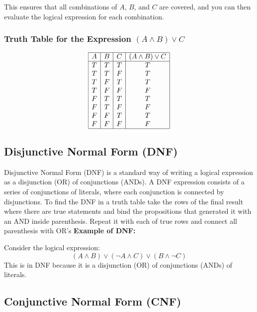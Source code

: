 This ensures that all combinations of \(A\), \(B\), and \(C\) are covered, and you can then evaluate the logical expression for each combination.

\subsubsection*{Truth Table for the Expression \( (A \land B) \lor C \)}

\[
	\begin{array}{|c|c|c|c|}
		\hline
		A & B & C & (A \land B) \lor C \\
		\hline
		T & T & T & T                  \\
		T & T & F & T                  \\
		T & F & T & T                  \\
		T & F & F & F                  \\
		F & T & T & T                  \\
		F & T & F & F                  \\
		F & F & T & T                  \\
		F & F & F & F                  \\
		\hline
	\end{array}
\]

\subsection{Disjunctive Normal Form (DNF)}

Disjunctive Normal Form (DNF) is a standard way of writing a logical expression as a disjunction
(OR) of conjunctions (ANDs). A DNF expression consists of a series of
conjunctions of literals, where each conjunction is connected by disjunctions.
\newline
To find the DNF in a truth table take the rows of the final result where there are
true statements and bind the propositions that generated it with an AND inside parenthesis.
Repeat it with each of true rows and connect all parenthesis with OR's
\newline
\textbf{Example of DNF:}

Consider the logical expression:
\[
	(A \land B) \lor (\neg A \land C) \lor (B \land \neg C)
\]
This is in DNF because it is a disjunction (OR) of conjunctions (ANDs) of literals.

\subsection{Conjunctive Normal Form (CNF)}


